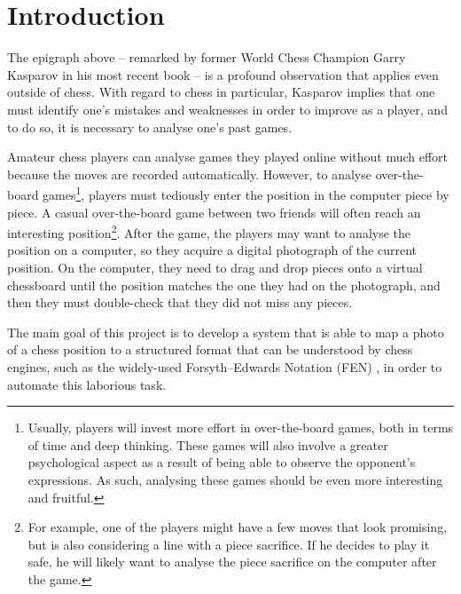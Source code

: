 \documentclass[../report.tex]{subfiles}
\begin{document}
\chapter{Introduction}
\label{chap:introduction}

The epigraph above -- remarked by former World Chess Champion Garry Kasparov in his most recent book \cite{kasparov2018} -- is a profound observation that applies even outside of chess.
With regard to chess in particular, Kasparov implies that one must identify one's mistakes and weaknesses in order to improve as a player, and to do so, it is necessary to analyse one's past games. 

Amateur chess players can analyse games they played online without much effort because the moves are recorded automatically.
However, to analyse over-the-board games\footnote{Usually, players will invest more effort in over-the-board games, both in terms of time and deep thinking. These games will also involve a greater psychological aspect as a result of being able to observe the opponent's expressions. As such, analysing these games should be even more interesting and fruitful.}, players must tediously enter the position in the computer piece by piece.
A casual over-the-board game between two friends will often reach an interesting position\footnote{For example, one of the players might have a few moves that look promising, but is also considering a line with a piece sacrifice. If he decides to play it safe, he will likely want to analyse the piece sacrifice on the computer after the game.}. 
After the game, the players may want to analyse the position on a computer, so they acquire a digital photograph of the current position.
On the computer, they need to drag and drop pieces onto a virtual chessboard until the position matches the one they had on the photograph, and then they must double-check that they did not miss any pieces.

The main goal of this project is to develop a system that is able to map a photo of a chess position to a structured format that can be understood by chess engines, such as the widely-used Forsyth–Edwards Notation (FEN) \cite{edwards1994}, in order to automate this laborious task.






\end{document}
